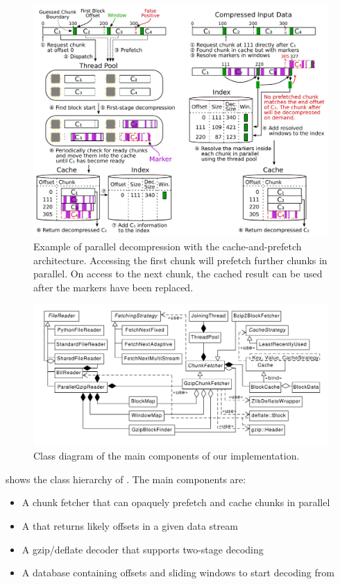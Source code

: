 


\begin{figure}
    \centering
    \includegraphics[width=\linewidth]{figures/cache-prefetch-architecture}
    \caption{Example of parallel decompression with the cache-and-prefetch architecture.
             Accessing the first chunk will prefetch further chunks in parallel.
             On access to the next chunk, the cached result can be used after the markers have been replaced.}
    \label{fig:parallel-decompression-process}
\end{figure}

\begin{figure}
    \centering
    \includegraphics[width=\linewidth]{figures/class-diagram}
    \caption{Class diagram of the main components of our implementation.}
    \label{fig:architecture}
\end{figure}

 shows the class hierarchy of \pragzip. The main components are:
\begin{itemize}
    \item A chunk fetcher that can opaquely prefetch and cache chunks in parallel
    \item A \blockfinder that returns likely  offsets in a given data stream
    \item A gzip/deflate decoder that supports two-stage decoding
    \item A database containing  offsets and sliding windows to start decoding from
\end{itemize}


